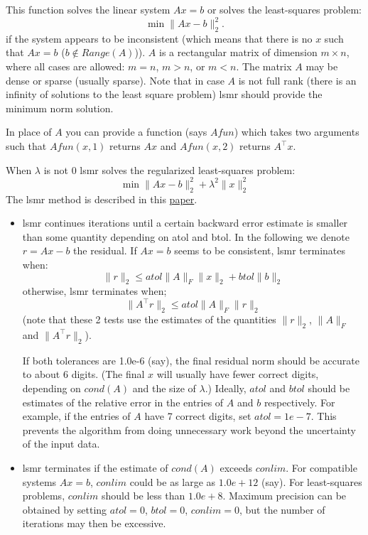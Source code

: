 \begin{mandescription}
This function solves the linear system $Ax = b$ or solves 
the least-squares problem:
$$
      \min \| A x - b \|^2_2. 
$$
if the system appears to be inconsistent (which means that there is no 
$x$ such that $A x=b$ ($b \notin Range(A)$)). $A$ is a rectangular matrix of 
dimension $m \times n$, where all cases are allowed: $m=n$, $m>n$, or $m<n$. 
The matrix $A$ may be dense or sparse (usually sparse). Note that in case
$A$ is not full rank (there is an infinity of solutions to the least square
problem) lsmr should provide the minimum norm solution.

In place of $A$ you can provide a function (says $Afun$) which takes two 
arguments such that $Afun(x,1)$ returns $A x$ and   $Afun(x,2)$ 
returns $A^{\top} x$.

When $\lambda$ is not $0$ lsmr solves the regularized least-squares problem:
$$
      \min \| A x - b \|^2_2 + \lambda^2 \| x \|^2_2 
$$
The lsmr method is described in this \href{http://arxiv.org/abs/1006.0758}{paper}.


\begin{itemize}
\item lsmr continues iterations until a certain backward error estimate is smaller 
than some quantity depending on atol and btol. In the following we denote $r = A x - b$ 
the residual. If $A x = b$ seems to be consistent, lsmr terminates when:
$$
   \| r \|_2  \le  atol \| A \|_F \| x \|_2 + btol \| b \|_2
$$
otherwise, lsmr terminates when;
$$
   \| A^{\top}r \|_2  \le  atol \| A \|_F \| r \|_2
$$
(note that these 2 tests use the estimates of the quantities $\|r\|_2$, $\| A \|_F$ 
and  $\| A^{\top}r \|_2$).

If both tolerances are 1.0e-6 (say), the final residual norm should be
accurate to about 6 digits. (The final $x$ will usually have fewer
correct digits, depending on $cond(A)$ and the size of $\lambda$.)
Ideally, $atol$ and $btol$ should be estimates of the relative error in the
entries of $A$ and $b$ respectively.  For example, if the entries of $A$
have 7 correct digits, set $atol = 1e-7$. This prevents the algorithm
from doing unnecessary work beyond the uncertainty of the input data.

\item lsmr terminates if the estimate of $cond(A)$ exceeds $conlim$.
For compatible systems $Ax = b$, $conlim$ could be as large as $1.0e+12$ (say).  
For least-squares problems, $conlim$ should be less than $1.0e+8$. 
Maximum precision can be obtained by setting $atol = 0$, $btol = 0$, $conlim=0$, 
but the number of iterations may then be excessive.


\end{itemize}
\end{mandescription}

